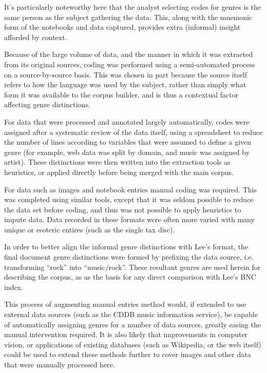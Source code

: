 It's particularly noteworthy here that the analyst selecting codes for genres is the same person as the subject gathering the data.  This, along with the mnemonic form of the notebooks and data captured, provides extra (informal) insight afforded by context.


Because of the large volume of data, and the manner in which it was extracted from its original sources, coding was performed using a semi-automated process on a source-by-source basis.  This was chosen in part because the source itself refers to how the language was used by the subject, rather than simply what form it was available to the corpus builder, and is thus a contextual factor affecting genre distinctions.

For data that were processed and annotated largely automatically, codes were assigned after a systematic review of the data itself, using a spreadsheet to reduce the number of lines according to variables that were assumed to define a given genre (for example, web data was split by domain, and music was assigned by artist).  These distinctions were then written into the extraction tools as heuristics, or applied directly before being merged with the main corpus.

For data such as images and notebook entries manual coding was required.  This was completed using similar tools, except that it was seldom possible to reduce the data set before coding, and thus was not possible to apply heuristics to impute data.  Data recorded in these formats were often more varied with many unique or esoteric entires (such as the single tax disc).

In order to better align the informal genre distinctions with Lee's format, the final document genre distinctions were formed by prefixing the data source, i.e. transforming ``rock'' into ``music/rock''.  These resultant genres are used herein for describing the corpus, as as the basis for any direct comparison with Lee's BNC index.




This process of augmenting manual entries method would, if extended to use external data sources (such as the CDDB music information service), be capable of automatically assigning genres for a number of data sources, greatly easing the manual intervention required.  It is also likely that improvements in computer vision, or applications of existing databases (such as Wikipedia, or the web itself) could be used to extend these methods further to cover images and other data that were manually processed here.
